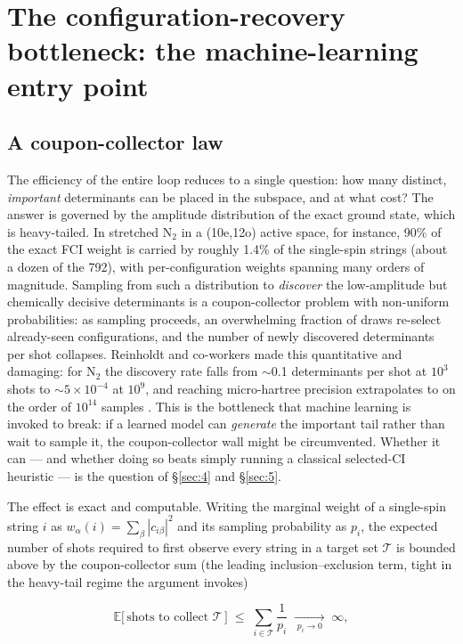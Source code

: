 \documentclass[11pt]{article}
\begin{document}
\section{The configuration-recovery bottleneck: the machine-learning entry point}\label{sec:3}


\subsection{A coupon-collector law}\label{sec:3-1}

The efficiency of the entire loop reduces to a single question: how many distinct, \emph{important} determinants can be placed in the subspace, and at what cost? The answer is governed by the amplitude distribution of the exact ground state, which is heavy-tailed. In stretched N$_2$ in a (10e,12o) active space, for instance, 90\% of the exact FCI weight is carried by roughly 1.4\% of the single-spin strings (about a dozen of the 792), with per-configuration weights spanning many orders of magnitude. Sampling from such a distribution to \emph{discover} the low-amplitude but chemically decisive determinants is a coupon-collector problem with non-uniform probabilities: as sampling proceeds, an overwhelming fraction of draws re-select already-seen configurations, and the number of newly discovered determinants per shot collapses. Reinholdt and co-workers made this quantitative and damaging: for N$_2$ the discovery rate falls from $\sim$0.1 determinants per shot at $10^3$ shots to $\sim\!5\times10^{-4}$ at $10^9$, and reaching micro-hartree precision extrapolates to on the order of $10^{14}$ samples \cite{reinholdt2025}. This is the bottleneck that machine learning is invoked to break: if a learned model can \emph{generate} the important tail rather than wait to sample it, the coupon-collector wall might be circumvented. Whether it can --- and whether doing so beats simply running a classical selected-CI heuristic --- is the question of \S\ref{sec:4} and \S\ref{sec:5}.

The effect is exact and computable. Writing the marginal weight of a single-spin string $i$ as $w_\alpha(i)=\sum_\beta|c_{i\beta}|^2$ and its sampling probability as $p_i$, the expected number of shots required to first observe every string in a target set $\mathcal T$ is bounded above by the coupon-collector sum (the leading inclusion--exclusion term, tight in the heavy-tail regime the argument invokes)

\begin{equation}
\mathbb E\big[\,\text{shots to collect } \mathcal T\,\big] \;\le\; \sum_{i\in\mathcal T}\frac{1}{p_i} \;\xrightarrow[\;p_i\to 0\;]{}\; \infty,
\end{equation}
\end{document}
